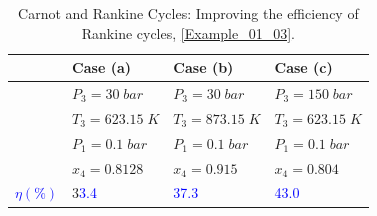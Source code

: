 \documentclass[12pts,a4paper,amsmath,amssymb,floatfix]{article}%
\begin{document}
\begin{enumerate}[label=\bfseries Example \arabic*]
\begin{enumerate}
\begin{table}
\begin{center}
\begin{tabular}{c |l l l }
\hline
          &  {\bf Case (a)}      &  {\bf Case (b) }     &  {\bf Case (c) }    \\ 
\hline 
          &   $P_{3}=30\;bar$     &  $P_{3}=30\;bar$     &  $P_{3}=150\;bar$    \\
          &   $T_{3}=623.15\;K$   &  $T_{3}=873.15\;K$   &  $T_{3}=623.15\;K$   \\
          &   $P_{1}=0.1\;bar$    &  $P_{1}=0.1\;bar$    &  $P_{1}=0.1\;bar$    \\
          &   $x_{4}=0.8128$      &   $x_{4}=0.915$      &  $x_{4}=0.804$       \\
\hline
\textcolor{blue}{$\eta \left(\%\right)$} &3\textcolor{blue}{3.4} &\textcolor{blue}{37.3}& \textcolor{blue}{43.0}      \\
\end{tabular}
\end{center}
\caption{Carnot and Rankine Cycles: Improving the efficiency of Rankine cycles, \ref{Example_01_03}.}
\label{Example01_01:Table2}
\end{table}

\end{enumerate}


\end{enumerate}

\clearpage
\end{document}
